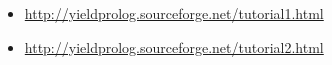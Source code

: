 \secdown

\begin{itemize}[nosep]
  \item 
\url{http://yieldprolog.sourceforge.net/tutorial1.html}
  \item 
\url{http://yieldprolog.sourceforge.net/tutorial2.html}
\end{itemize}

\secdown



\secup
\secup
